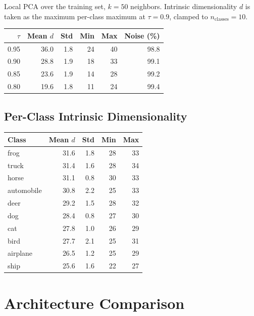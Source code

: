 \documentclass[11pt,letterpaper]{article}
\begin{document}
Local PCA over the training set, $k = 50$ neighbors. Intrinsic dimensionality $d$ is taken as the maximum per-class maximum at $\tau = 0.9$, clamped to $n_{\mathrm{classes}} = 10$.

\begin{tabular}{@{}rrrrrr@{}}
\toprule
$\tau$ & Mean $d$ & Std & Min & Max & Noise (\%) \\
\midrule
  0.95 & 36.0 & 1.8 & 24 & 40 & 98.8 \\
  0.90 & 28.8 & 1.9 & 18 & 33 & 99.1 \\
  0.85 & 23.6 & 1.9 & 14 & 28 & 99.2 \\
  0.80 & 19.6 & 1.8 & 11 & 24 & 99.4 \\
\bottomrule
\end{tabular}

\subsection{Per-Class Intrinsic Dimensionality}

\begin{tabular}{@{}lrrrr@{}}
\toprule
Class & Mean $d$ & Std & Min & Max \\
\midrule
  frog & 31.6 & 1.8 & 28 & 33 \\
  truck & 31.4 & 1.6 & 28 & 34 \\
  horse & 31.1 & 0.8 & 30 & 33 \\
  automobile & 30.8 & 2.2 & 25 & 33 \\
  deer & 29.2 & 1.5 & 28 & 32 \\
  dog & 28.4 & 0.8 & 27 & 30 \\
  cat & 27.8 & 1.0 & 26 & 29 \\
  bird & 27.7 & 2.1 & 25 & 31 \\
  airplane & 26.5 & 1.2 & 25 & 29 \\
  ship & 25.6 & 1.6 & 22 & 27 \\
\bottomrule
\end{tabular}

\section{Architecture Comparison}
\end{document}
